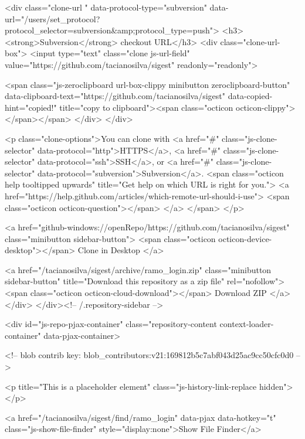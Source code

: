   

<div class="clone-url "
  data-protocol-type="subversion"
  data-url="/users/set_protocol?protocol_selector=subversion&amp;protocol_type=push">
  <h3><strong>Subversion</strong> checkout URL</h3>
  <div class="clone-url-box">
    <input type="text" class="clone js-url-field"
           value="https://github.com/tacianosilva/sigest" readonly="readonly">

    <span class="js-zeroclipboard url-box-clippy minibutton zeroclipboard-button" data-clipboard-text="https://github.com/tacianosilva/sigest" data-copied-hint="copied!" title="copy to clipboard"><span class="octicon octicon-clippy"></span></span>
  </div>
</div>


<p class="clone-options">You can clone with
      <a href="#" class="js-clone-selector" data-protocol="http">HTTPS</a>,
      <a href="#" class="js-clone-selector" data-protocol="ssh">SSH</a>,
      or <a href="#" class="js-clone-selector" data-protocol="subversion">Subversion</a>.
  <span class="octicon help tooltipped upwards" title="Get help on which URL is right for you.">
    <a href="https://help.github.com/articles/which-remote-url-should-i-use">
    <span class="octicon octicon-question"></span>
    </a>
  </span>
</p>


  <a href="github-windows://openRepo/https://github.com/tacianosilva/sigest" class="minibutton sidebar-button">
    <span class="octicon octicon-device-desktop"></span>
    Clone in Desktop
  </a>

              <a href="/tacianosilva/sigest/archive/ramo_login.zip"
                 class="minibutton sidebar-button"
                 title="Download this repository as a zip file"
                 rel="nofollow">
                <span class="octicon octicon-cloud-download"></span>
                Download ZIP
              </a>
            </div>
        </div><!-- /.repository-sidebar -->

        <div id="js-repo-pjax-container" class="repository-content context-loader-container" data-pjax-container>
          


<!-- blob contrib key: blob_contributors:v21:169812b5c7abf043d25ac9cc50cfc0d0 -->

<p title="This is a placeholder element" class="js-history-link-replace hidden"></p>

<a href="/tacianosilva/sigest/find/ramo_login" data-pjax data-hotkey="t" class="js-show-file-finder" style="display:none">Show File Finder</a>

